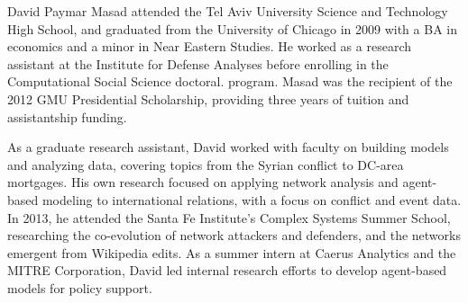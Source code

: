 \documentclass[11 pt]{report}
\begin{document}

\startofchapters
















%
%

%
%
%

\printbibliography

\cvpage

David Paymar Masad attended the Tel Aviv University Science and Technology High School, and graduated from the University of Chicago in 2009 with a BA in economics and a minor in Near Eastern Studies. He worked as a research assistant at the Institute for Defense Analyses before enrolling in the Computational Social Science doctoral. program. Masad was the recipient of the 2012 GMU Presidential Scholarship, providing three years of tuition and assistantship funding.

As a graduate research assistant, David worked with faculty on building models and analyzing data, covering topics from the Syrian conflict to DC-area mortgages. His own research focused on applying network analysis and agent-based modeling to international relations, with a focus on conflict and event data. In 2013, he attended the Santa Fe Institute's Complex Systems Summer School, researching the co-evolution of network attackers and defenders, and the networks emergent from Wikipedia edits. As a summer intern at Caerus Analytics and the MITRE Corporation, David led internal research efforts to develop agent-based models for policy support.
\end{document}
